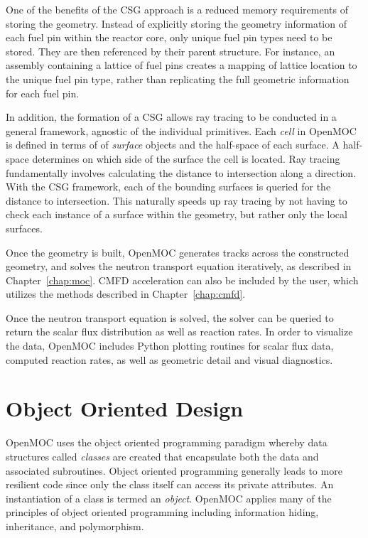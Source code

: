 One of the benefits of the \ac{CSG} approach is a reduced memory requirements of storing the geometry. Instead of explicitly storing the geometry information of each fuel pin within the reactor core, only unique fuel pin types need to be stored. They are then referenced by their parent structure. For instance, an assembly containing a lattice of fuel pins creates a mapping of lattice location to the unique fuel pin type, rather than replicating the full geometric information for each fuel pin.

In addition, the formation of a \ac{CSG} allows ray tracing to be conducted in a general framework, agnostic of the individual primitives. Each \textit{cell} in OpenMOC is defined in terms of of \textit{surface} objects and the half-space of each surface. A half-space determines on which side of the surface the cell is located. Ray tracing fundamentally involves calculating the distance to intersection along a direction. With the \ac{CSG} framework, each of the bounding surfaces is queried for the distance to intersection. This naturally speeds up ray tracing by not having to check each instance of a surface within the geometry, but rather only the local surfaces. 

Once the geometry is built, OpenMOC generates tracks across the constructed geometry, and solves the neutron transport equation iteratively, as described in Chapter~\ref{chap:moc}. CMFD acceleration can also be included by the user, which utilizes the methods described in Chapter~\ref{chap:cmfd}.

Once the neutron transport equation is solved, the solver can be queried to return the scalar flux distribution as well as reaction rates. In order to visualize the data, OpenMOC includes Python plotting routines for scalar flux data, computed reaction rates, as well as geometric detail and visual diagnostics. 


\section{Object Oriented Design}
\label{sec:object-oriented}

OpenMOC uses the object oriented programming paradigm whereby data structures called \textit{classes} are created that encapsulate both the data and associated subroutines. Object oriented programming generally leads to more resilient code since only the class itself can access its private attributes. An instantiation of a class is termed an \textit{object}. OpenMOC applies many of the principles of object oriented programming including information hiding, inheritance, and polymorphism.

